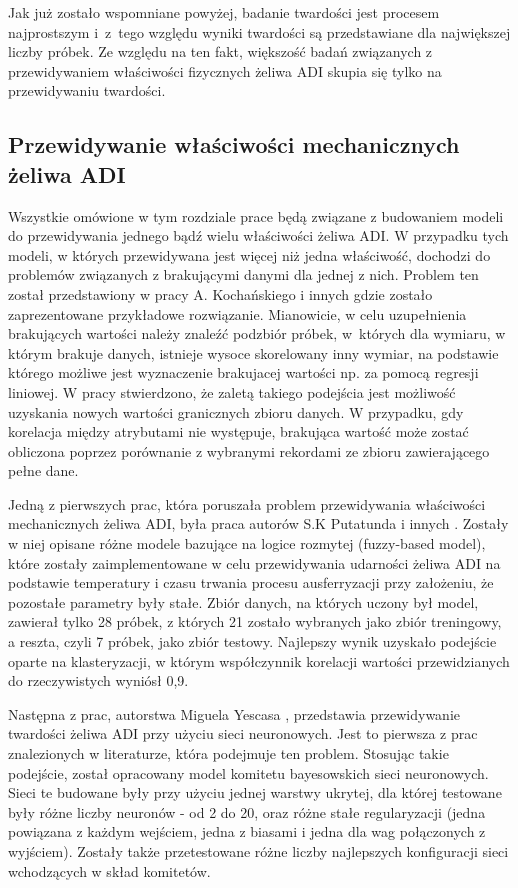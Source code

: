 Jak już zostało wspomniane powyżej, badanie twardości jest procesem najprostszym i~z~tego względu wyniki twardości są przedstawiane dla największej liczby próbek. Ze względu na ten fakt, większość badań związanych z przewidywaniem właściwości fizycznych żeliwa ADI skupia się tylko na przewidywaniu twardości.

\subsection{Przewidywanie właściwości mechanicznych żeliwa ADI}\label{sec:sota-prediction}
Wszystkie omówione w tym rozdziale prace będą związane z budowaniem modeli do przewidywania jednego bądź wielu właściwości żeliwa ADI. W przypadku tych modeli, w których przewidywana jest więcej niż jedna właściwość, dochodzi do problemów związanych z brakującymi danymi dla jednej z nich. Problem ten został przedstawiony w pracy A. Kochańskiego i innych \cite{Kochanski12} gdzie zostało zaprezentowane przykładowe rozwiązanie. Mianowicie, w celu uzupełnienia brakujących wartości należy znaleźć podzbiór próbek, w~których dla wymiaru, w którym brakuje danych, istnieje wysoce skorelowany inny wymiar, na podstawie którego możliwe jest wyznaczenie brakujacej wartości np. za pomocą regresji liniowej. W pracy stwierdzono, że zaletą takiego podejścia jest możliwość uzyskania nowych wartości granicznych zbioru danych. W przypadku, gdy korelacja między atrybutami nie występuje, brakująca wartość może zostać obliczona poprzez porównanie z wybranymi rekordami ze zbioru zawierającego pełne dane.

Jedną z pierwszych prac, która poruszała problem przewidywania właściwości mechanicznych żeliwa ADI, była praca autorów S.K Putatunda i innych \cite{777072}. Zostały w niej opisane różne modele bazujące na logice rozmytej (fuzzy-based model), które zostały zaimplementowane w celu przewidywania udarności żeliwa ADI na podstawie temperatury i czasu trwania procesu ausferryzacji przy założeniu, że pozostałe parametry były stałe. Zbiór danych, na których uczony był model, zawierał tylko 28 próbek, z których 21 zostało wybranych jako zbiór treningowy, a reszta, czyli 7 próbek, jako zbiór testowy. Najlepszy wynik uzyskało podejście oparte na klasteryzacji, w którym współczynnik korelacji wartości przewidzianych do rzeczywistych wyniósł 0,9. 

Następna z prac, autorstwa Miguela Yescasa \cite{doi:10.1080/13640461.2003.11819537}, przedstawia przewidywanie twardości żeliwa ADI przy użyciu sieci neuronowych. Jest to pierwsza z prac znalezionych w literaturze, która podejmuje ten problem. Stosując takie podejście, został opracowany model komitetu bayesowskich sieci neuronowych. Sieci te budowane były przy użyciu jednej warstwy ukrytej, dla której testowane były różne liczby neuronów - od 2 do 20, oraz różne stałe regularyzacji (jedna powiązana z każdym wejściem, jedna z biasami i jedna dla wag połączonych z wyjściem). Zostały także przetestowane różne liczby najlepszych konfiguracji sieci wchodzących w skład komitetów. 


